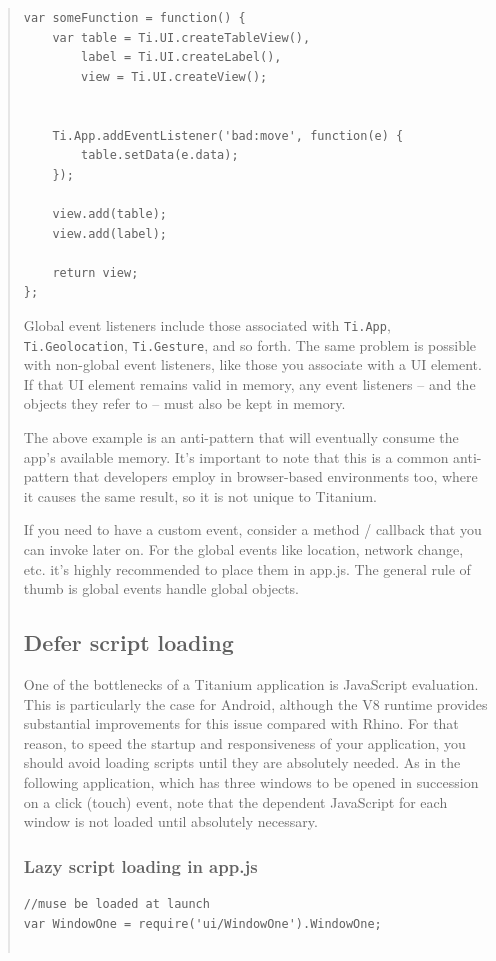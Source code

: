 \documentclass[11pt]{book}
\begin{document}
\begin{quotation}
\begin{lstlisting}[frame=single]
var someFunction = function() {
    var table = Ti.UI.createTableView(),
        label = Ti.UI.createLabel(),
        view = Ti.UI.createView();


    Ti.App.addEventListener('bad:move', function(e) {
        table.setData(e.data);
    });

    view.add(table);
    view.add(label);

    return view;
};
\end{lstlisting}

Global event listeners include those associated with \texttt{Ti.App}, \texttt{Ti.Geolocation}, \texttt{Ti.Gesture}, and so forth. The same problem is possible with non-global event listeners, like those you associate with a UI element. If that UI element remains valid in memory, any event listeners – and the objects they refer to – must also be kept in memory.

The above example is an anti-pattern that will eventually consume the app's available memory. It's important to note that this is a common anti-pattern that developers employ in browser-based environments too, where it causes the same result, so it is not unique to Titanium.

If you need to have a custom event, consider a method / callback that you can invoke later on. For the global events like location, network change, etc. it's highly recommended to place them in app.js. The general rule of thumb is global events handle global objects.

\subsection{Defer script loading}
One of the bottlenecks of a Titanium application is JavaScript evaluation. This is particularly the case for Android, although the V8 runtime provides substantial improvements for this issue compared with Rhino. For that reason, to speed the startup and responsiveness of your application, you should avoid loading scripts until they are absolutely needed. As in the following application, which has three windows to be opened in succession on a click (touch) event, note that the dependent JavaScript for each window is not loaded until absolutely necessary.

\subsubsection{Lazy script loading in app.js}
\begin{lstlisting}[frame=single]
//muse be loaded at launch
var WindowOne = require('ui/WindowOne').WindowOne;


\end{lstlisting}
\end{quotation}
\end{document}
